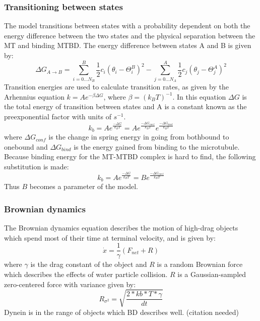\documentclass[10pt]{article} %
\begin{document}
\subsubsection{Transitioning between states}
The model transitions between states with a probability dependent on both the energy difference between the two states and the physical separation between the MT and binding MTBD. The energy difference between states A and B is given by:
%
\begin{equation}
  \Delta G_{A\rightarrow B} = \sum_{i=0...N_B}^{B} \frac{1}{2}c_i\left(\theta_i-\Theta_i^B\right)^2 - \sum_{j=0...N_A}^{A} \frac{1}{2}c_j\left(\theta_j-\Theta_j^A\right)^2
\end{equation}
%
Transition energies are used to calculate transition rates, as given by the Arhennius equation $k=Ae^{-\beta\Delta G}$, where $\beta = (k_BT)^{-1}$. In this equation $\Delta G$ is the total energy of transition between states and A is a constant known as the preexponential factor with units of $s^{-1}$.\\
%
\begin{equation}
  k_b = Ae^{\frac{-\Delta G}{k_BT}} = Ae^{\frac{-\Delta G_{conf}}{k_BT}}e^{\frac{-\Delta G_{bind}}{k_BT}}
\end{equation}
%
where $\Delta G_{conf}$ is the change in spring energy in going from bothbound to onebound and $\Delta G_{bind}$ is the energy gained from binding to the microtubule. Because binding energy for the MT-MTBD complex is hard to find, the following substitution is made:
%
\begin{equation}
  k_b = Ae^{\frac{-\Delta G}{k_BT}} = Be^{\frac{-\Delta G_{conf}}{k_BT}}
\end{equation}
%
Thus $B$ becomes a parameter of the model.\\

\subsubsection{Brownian dynamics}
The Brownian dynamics equation describes the motion of high-drag objects which spend most of their time at terminal velocity, and is given by:
%
\begin{equation}
  \dot{x} = \frac{1}{\gamma}\left(F_{net} + R\right)
\end{equation}
%
where $\gamma$ is the drag constant of the object and $R$ is a random Brownian force which describes the effects of water particle collision. $R$ is a Gaussian-sampled zero-centered force with variance given by:
%
\begin{equation}
  R_{\sigma^2} = \sqrt{\frac{2*kb*T*\gamma}{dt}}
\end{equation}
%
Dynein is in the range of objects which BD describes well. (citation needed)
\end{document}
